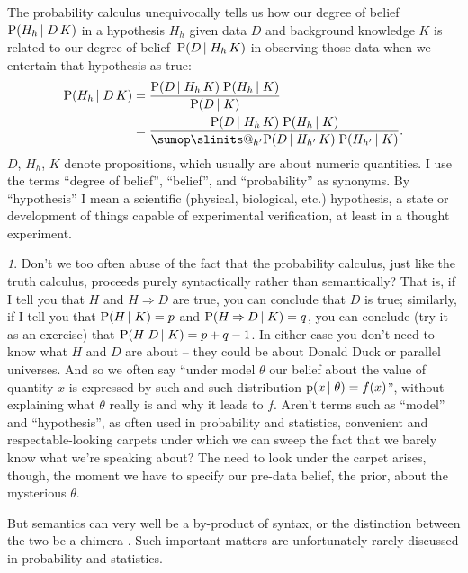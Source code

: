 \documentclass[\ifafour a4paper,12pt,\else a5paper,10pt,\fi%
onecolumn,oneside,article,%
british%
]{memoir}
\makeatletter
\theoremstyle{remark}
\theoremstyle{innote}
\newtheorem*{innote}{}
\def\sum{\DOTSI\sumop\slimits@}
\newcommand*{\citep}{\parencites}
\newcommand*{\limplies}{\mathbin{\Rightarrow}}%
\newcommand*{\pf}{\mathrm{p}}%
\newcommand*{\p}{\mathrm{P}}%
\renewcommand*{\|}[1][]{\nonscript\,#1\vert\nonscript\;\mathopen{}}
\newcommand*{\etc}{{etc.}}
\newcommand*{\dob}{degree of belief}
\newcommand*{\yK}{K}
\makeatother
\begin{document}
The probability calculus unequivocally tells us how our \dob\
$\p(H_{h} \| D \, \yK)$ in a hypothesis $H_{h}$ given data $D$ and
background knowledge $\yK$ is related to our \dob\ $\p(D \| H_{h} \, \yK)$
in observing those data when we entertain that hypothesis as true:
\begin{subequations}
    \label{eq:posterior_hypothesis}
  \begin{align}
    \label{eq:posterior_hypothesis_universal}
    \p(H_{h} \| D \, \yK) &=
    \frac{\p(D \| H_{h} \, \yK)\;\p(H_{h} \| \yK)}{\p(D \| \yK)}\\
    \label{eq:posterior_hypothesis_sethypotheses}
    &=\frac{\p(D \| H_{h} \, \yK)\;\p(H_{h} \| \yK)}{\sum_{h'} \p(D \| H_{h'} \, \yK)\; \p(H_{h'} \| \yK)}.
  \end{align}
\end{subequations}
$D$, $H_{h}$, $\yK$ denote propositions, which usually are about numeric
quantities. I use the terms \enquote{\dob}, \enquote{belief}, and
\enquote{probability} as synonyms. By \enquote{hypothesis} I mean a
scientific (physical, biological, \etc) hypothesis, a state or development
of things capable of experimental verification, at least in a thought
experiment.
\begin{innote}
  Don't we too often abuse of the fact that the probability calculus, just
  like the truth calculus, proceeds purely syntactically rather than
  semantically? That is, if I tell you that $H$ and $H \limplies D$ are
  true, you can conclude that $D$ is true; similarly, if I tell you that
  $\p(H \| \yK) = p$ and $\p(H \limplies D \| \yK) = q$, you can conclude
  (try it as an exercise) that $\p(H\;D \| \yK) = p + q -1$. In either case
  you don't need to know what $H$ and $D$ are about -- they could be about
  Donald Duck or parallel universes. And so we often say \enquote{under
    model $\theta$ our belief about the value of quantity $x$ is expressed
    by such and such distribution $\pf(x \| \theta)=f(x)$}, without
  explaining what $\theta$ really is and why it leads to $f$. Aren't terms
  such as \enquote{model} and \enquote{hypothesis}, as often used in
  probability and statistics, convenient and respectable-looking carpets
  under which we can sweep the fact that we barely know what we're speaking
  about? The need to look under the carpet arises, though, the moment we
  have to specify our pre-data belief, the prior, about the mysterious
  $\theta$.
  
  But semantics can very well be a by-product of syntax, or the distinction
  between the two be a chimera
  \citep{wittgenstein1945_t1999,girard2001,girard2003}. Such important
  matters are unfortunately rarely discussed in probability and statistics.
\end{innote}
\end{document}
